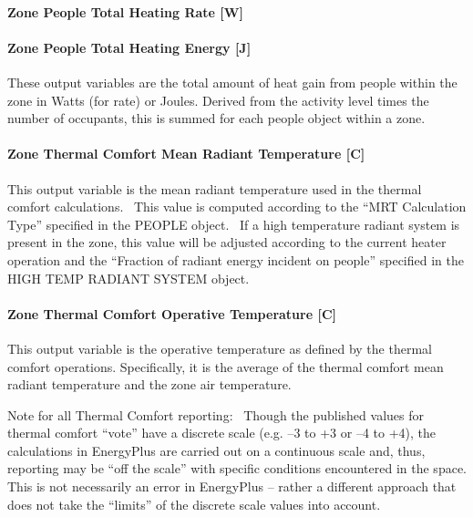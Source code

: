 \paragraph{Zone People Total Heating Rate {[}W{]}}\label{zone-people-total-heating-rate-w}

\paragraph{Zone People Total Heating Energy {[}J{]}}\label{zone-people-total-heating-energy-j}

These output variables are the total amount of heat gain from people within the zone in Watts (for rate) or Joules. Derived from the activity level times the number of occupants, this is summed for each people object within a zone.

\paragraph{Zone Thermal Comfort Mean Radiant Temperature {[}C{]}}\label{zone-thermal-comfort-mean-radiant-temperature-c}

This output variable is the mean radiant temperature used in the thermal comfort calculations.~ This value is computed according to the ``MRT Calculation Type'' specified in the PEOPLE object.~ If a high temperature radiant system is present in the zone, this value will be adjusted according to the current heater operation and the ``Fraction of radiant energy incident on people'' specified in the HIGH TEMP RADIANT SYSTEM object.

\paragraph{Zone Thermal Comfort Operative Temperature {[}C{]}}\label{zone-thermal-comfort-operative-temperature-c}

This output variable is the operative temperature as defined by the thermal comfort operations. Specifically, it is the average of the thermal comfort mean radiant temperature and the zone air temperature.

Note for all Thermal Comfort reporting:~ Though the published values for thermal comfort ``vote'' have a discrete scale (e.g. --3 to +3 or --4 to +4), the calculations in EnergyPlus are carried out on a continuous scale and, thus, reporting may be ``off the scale'' with specific conditions encountered in the space. This is not necessarily an error in EnergyPlus -- rather a different approach that does not take the ``limits'' of the discrete scale values into account.


